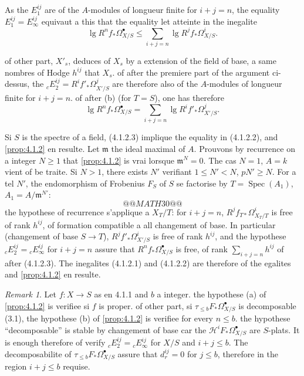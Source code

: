 \documentclass[12pt,a4paper]{article}
\theoremstyle{plain}
\theoremstyle{definition}
\theoremstyle{remark}
\newtheorem{remark}[theorem]{Remark}
\DeclareMathOperator{\Spec}{Spec}
\begin{document}
As the $E_1^{ij}$ are of the $A$-modules of longueur finite for $i + j = n$, the equality $E_1^{ij} = E_\infty^{ij}$ equivaut a this that the equality let atteinte in the inegalite
\begin{equation}\label{eq:4.1.2.2}
\lg R^n f_* \Omega^{\bullet}_{X/S} \le \sum_{i+j=n} \lg R^j f_* \Omega^i_{X/S}.
\end{equation}

of other part, $X'_s$, deduces of $X_s$ by a extension of the field of base, a same nombres of Hodge $h^{ij}$ that $X_s$. of after the premiere part of the argument ci-dessus, the ${}_c E_2^{ij} = R^i f'_* \Omega^j_{X'/S}$ are therefore also of the $A$-modules of longueur finite for $i + j = n$. of after (b) (for $T = S$), one has therefore
\begin{equation}\label{eq:4.1.2.3}
\lg R^n f_* \Omega^{\bullet}_{X/S} = \sum_{i+j=n} \lg R^i f'_* \Omega^j_{X'/S}.
\end{equation}

Si $S$ is the spectre of a field, (4.1.2.3) implique the equality in (4.1.2.2), and \ref{prop:4.1.2} en resulte. Let $\mathfrak{m}$ the ideal maximal of $A$. Prouvons by recurrence on a integer $N \ge 1$ that \ref{prop:4.1.2} is vrai lorsque $\mathfrak{m}^N = 0$. The cas $N = 1$, $A = k$ vient of be traite. Si $N > 1$, there exists $N'$ verifiant $1 \le N' < N$, $pN' \ge N$. For a tel $N'$, the endomorphism of Frobenius $F_S$ of $S$ se factorise by $T = \Spec(A_1)$, $A_1 = A/\mathfrak{m}^{N'}$:
\[
@@MATH30@@
\]
the hypothese of recurrence s'applique a $X_T/T$: for $i + j = n$, $R^j f_{T*} \Omega^i_{X_T/T}$ is free of rank $h^{ij}$, of formation compatible a all changement of base. In particular (changement of base $S \to T$), $R^j f'_* \Omega^i_{X'/S}$ is free of rank $h^{ij}$, and the hypothese ${}_c E_2^{ij} = {}_c E_\infty^{ij}$ for $i + j = n$ assure that $R^n f_* \Omega^{\bullet}_{X/S}$ is free, of rank $\sum_{i+j=n} h^{ij}$ of after (4.1.2.3). The inegalites (4.1.2.1) and (4.1.2.2) are therefore of the egalites and \ref{prop:4.1.2} en resulte.

\begin{remark}\label{rem:4.1.3}
Let $f: X \to S$ as en 4.1.1 and $b$ a integer. the hypothese (a) of \ref{prop:4.1.2} is verifiee si $f$ is proper. of other part, si $\tau_{\le b} F_* \Omega^{\bullet}_{X/S}$ is decomposable (3.1), the hypothese (b) of \ref{prop:4.1.2} is verifiee for every $n \le b$. the hypothese ``decomposable'' is stable by changement of base car the $\mathscr{H}^i F_* \Omega^{\bullet}_{X/S}$ are $S$-plats. It is enough therefore of verify ${}_c E_2^{ij} = {}_c E_\infty^{ij}$ for $X/S$ and $i + j \le b$. The decomposabilite of $\tau_{\le b} F_* \Omega^{\bullet}_{X/S}$ assure that $d_r^{ij} = 0$ for $j \le b$, therefore in the region $i + j \le b$ requise.
\end{remark}
\end{document}
